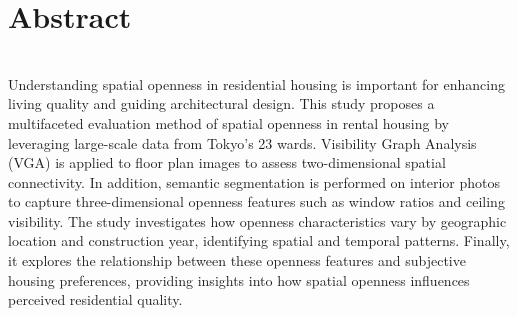 \chapter*{Abstract}
\Huge
\begin{centering} 
\textbf{}
\end{centering}
\normalsize\\

Understanding  spatial  openness  in  residential  housing  is  important  for  enhancing  living  quality  and  guiding architectural design. 
This study proposes a multifaceted evaluation method of spatial openness in rental housing by leveraging large-scale data from Tokyo’s 23 wards. 
Visibility Graph Analysis (VGA) is applied to floor plan images  to  assess  two-dimensional  spatial  connectivity.  
In  addition,  semantic  segmentation  is  performed  on interior photos to capture three-dimensional openness features such as window ratios and ceiling visibility. 
The study investigates how openness characteristics vary by geographic location and construction year, identifying spatial  and  temporal  patterns.  
Finally,  it  explores  the  relationship  between  these  openness  features  and subjective housing preferences, providing insights into how spatial openness influences perceived residential quality.


